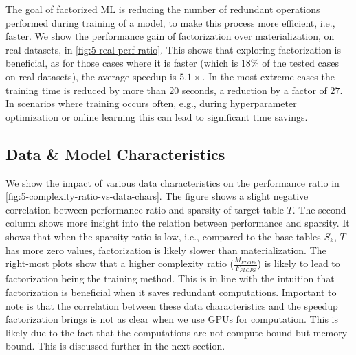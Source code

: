 The goal of factorized ML is reducing the number of redundant operations performed during training of a model, to make this process more efficient, i.e., faster. We show the performance gain of factorization over materialization, on real datasets, in \autoref{fig:5-real-perf-ratio}. This shows that exploring factorization is beneficial, as for those cases where it is faster (which is $18\%$ of the tested cases on real datasets), the average speedup is $5.1\times$. In the most extreme cases the training time is reduced by more than $20$ seconds, a reduction by a factor of $27$. In scenarios where training occurs often, e.g., during hyperparameter optimization or online learning this can lead to significant time savings.


\subsection{Data \& Model Characteristics}

We show the impact of various data characteristics on the performance ratio in \autoref{fig:5-complexity-ratio-vs-data-chars}. The figure shows a slight negative correlation between performance ratio and sparsity of target table $T$. The second column shows more insight into the relation between performance and sparsity. It shows that when the sparsity ratio is low, i.e., compared to the base tables $S_k$, $T$ has more zero values, factorization is likely slower than materialization. The right-most plots show that a higher complexity ratio ($\frac{M_{FLOPs}}{F_{FLOPS}}$) is likely to lead to factorization being the training method. This is in line with the intuition that factorization is beneficial when it saves redundant computations. Important to note is that the correlation between these data characteristics and the speedup factorization brings is not as clear when we use GPUs for computation. This is likely due to the fact that the computations are not compute-bound but memory-bound. This is discussed further in the next section.

